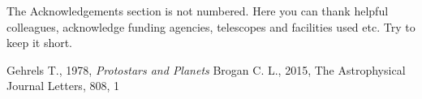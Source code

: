 \documentclass[a4paper,fleqn,usenatbib]{mnras}
\begin{document}
The Acknowledgements section is not numbered. Here you can thank helpful
colleagues, acknowledge funding agencies, telescopes and facilities used etc.
Try to keep it short.




%


\begin{thebibliography}{99}
Gehrels T., 1978, \textit{Protostars and Planets}
Brogan C. L., 2015, The Astrophysical Journal Letters, 808, 1
\end{thebibliography}


\bsp	%
\label{lastpage}
\end{document}
